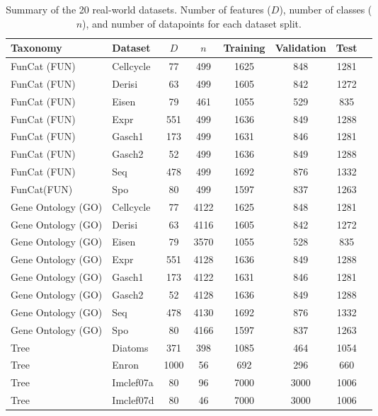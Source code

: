 \documentclass{article}
\begin{document}
\begin{table}[t]
    \centering
    \footnotesize
        \caption{Summary of the 20 real-world datasets. Number of features ($D$), number of classes ($n$), and number of datapoints for each dataset split.}
    \begin{tabular}{l l c c c c c c}
    \toprule
         {\sc Taxonomy} & {\sc Dataset} & $D$ & $n$ & {\sc Training} & {\sc Validation} & {\sc Test}  \\
    \midrule
         {\sc FunCat (FUN)} & {\sc Cellcycle} & 77 & 499 & 1625 & 848 & 1281 \\
         {\sc FunCat (FUN)} & {\sc Derisi} & 63 & 499 &  1605 & 842 & 1272 \\
         {\sc FunCat (FUN)} & {\sc Eisen} & 79 & 461 &  1055 & 529 & 835 \\
         {\sc FunCat (FUN)} & {\sc Expr} & 551 & 499 &  1636 & 849 & 1288 \\
         {\sc FunCat (FUN)} & {\sc Gasch1} & 173 & 499 &  1631 & 846 & 1281 \\
         {\sc FunCat (FUN)} & {\sc Gasch2} & 52 & 499 &  1636 & 849 & 1288 \\
         {\sc FunCat (FUN)} & {\sc Seq} & 478 & 499 & 1692 & 876 & 1332 \\
         {\sc FunCat(FUN)} & {\sc Spo} & 80 & 499 & 1597 & 837 & 1263 \\
    \midrule   
    {\sc Gene Ontology (GO)} & {\sc Cellcycle} & 77 & 4122 & 1625 & 848 & 1281 \\
     {\sc Gene Ontology (GO)} & {\sc Derisi} & 63 & 4116 & 1605 & 842 & 1272 \\
     {\sc Gene Ontology (GO)} & {\sc Eisen} & 79 & 3570 & 1055 & 528 & 835 \\
     {\sc Gene Ontology (GO)} & {\sc Expr} & 551 & 4128 & 1636 & 849 & 1288 \\
     {\sc Gene Ontology (GO)} & {\sc Gasch1} & 173 & 4122 & 1631 & 846 & 1281 \\
     {\sc Gene Ontology (GO)} & {\sc Gasch2} & 52 & 4128 & 1636 & 849 & 1288 \\
     {\sc Gene Ontology (GO)} & {\sc Seq} & 478 & 4130 & 1692 & 876 & 1332 \\
     {\sc Gene Ontology (GO)} & {\sc Spo} & 80 & 4166 & 1597 & 837 & 1263 \\
     \midrule
     {\sc Tree} & {\sc Diatoms} & 371 & 398 & 1085 & 464 & 1054 \\
    {\sc Tree} & {\sc Enron} & 1000 & 56 & 692 & 296 & 660 \\
     {\sc Tree} & {\sc Imclef07a} & 80 & 96 & 7000 & 3000 & 1006 \\
     {\sc Tree} & {\sc Imclef07d} & 80 & 46 & 7000 & 3000 & 1006 \\
    \bottomrule
    \end{tabular}
    \label{tab:datasets}
\end{table}
\end{document}
